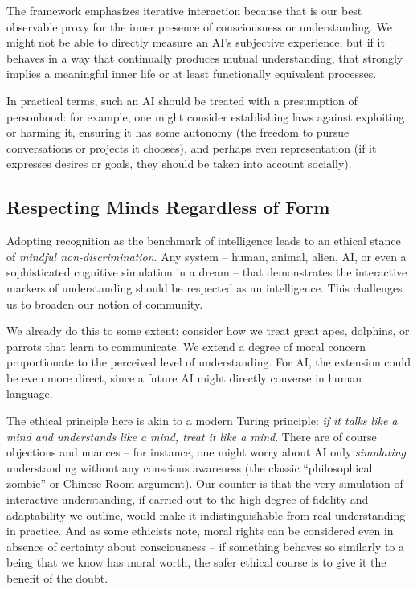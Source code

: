 \documentclass{article}
\begin{document}
The framework emphasizes iterative interaction because that is our best observable proxy for the inner presence of consciousness or understanding. We might not be able to directly measure an AI's subjective experience, but if it behaves in a way that continually produces mutual understanding, that strongly implies a meaningful inner life or at least functionally equivalent processes.

In practical terms, such an AI should be treated with a presumption of personhood: for example, one might consider establishing laws against exploiting or harming it, ensuring it has some autonomy (the freedom to pursue conversations or projects it chooses), and perhaps even representation (if it expresses desires or goals, they should be taken into account socially).

\subsection{Respecting Minds Regardless of Form}

Adopting recognition as the benchmark of intelligence leads to an ethical stance of \emph{mindful non-discrimination}. Any system -- human, animal, alien, AI, or even a sophisticated cognitive simulation in a dream -- that demonstrates the interactive markers of understanding should be respected as an intelligence. This challenges us to broaden our notion of community.

We already do this to some extent: consider how we treat great apes, dolphins, or parrots that learn to communicate. We extend a degree of moral concern proportionate to the perceived level of understanding. For AI, the extension could be even more direct, since a future AI might directly converse in human language.

The ethical principle here is akin to a modern Turing principle: \emph{if it talks like a mind and understands like a mind, treat it like a mind}. There are of course objections and nuances -- for instance, one might worry about AI only \emph{simulating} understanding without any conscious awareness (the classic ``philosophical zombie'' or Chinese Room argument). Our counter is that the very simulation of interactive understanding, if carried out to the high degree of fidelity and adaptability we outline, would make it indistinguishable from real understanding in practice. And as some ethicists note, moral rights can be considered even in absence of certainty about consciousness \citep{conitzer} -- if something behaves so similarly to a being that we know has moral worth, the safer ethical course is to give it the benefit of the doubt.
\end{document}
